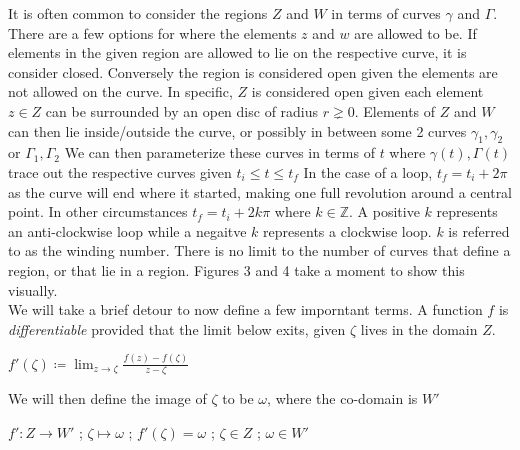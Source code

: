\documentclass[a4paper,man,natbib]{apa6}
\newcommand{\Z}{\mathbb{Z}}  %
\begin{document}
It is often common to consider the regions $ Z $ and $ W $ in terms of curves $ \gamma $ and $ \Gamma $.
There are a few options for where the elements $ z $ and $ w $ are allowed to be. If elements in the given region are allowed to lie on the respective curve, it is consider closed.
Conversely the region is considered open given the elements are not allowed on the curve. 
In specific, $ Z $ is considered open given each element $ z \in Z $ can be surrounded by an open disc of radius $ r \gneq  0 $.
Elements of $ Z $ and $ W $ can then lie inside/outside the curve, or possibly in between some 2 curves  $ \gamma_{1},\gamma_{2} $ or $ \Gamma_{1},\Gamma_{2} $
We can then parameterize these curves in terms of $ t $ where $ \gamma(t), \Gamma(t) $ trace out the respective curves given $ t_{i} \leq t \leq t_{f} $
In the case of a loop, $ t_{f} = t_{i} + 2\pi $ as the curve will end where it started, making one full revolution around a central point. 
In other circumstances $ t_{f} = t_{i} + 2k\pi $ where $ k \in \Z $. A positive $ k $ represents an anti-clockwise loop while a negaitve $ k $ represents a clockwise loop. 
$ k $ is referred to as the winding number. There is no limit to the number of curves that define a region, or that lie in a region. 
Figures 3 and 4 take a moment to show this visually. 
\\
We will take a brief detour to now define a few imporntant terms. 
A function $ f $ is \textit{differentiable} provided that the limit below exits, given $ \zeta $ lives in the domain $ Z $.

\begin{center}

      $ f'(\zeta) \coloneqq \lim_{z \to \zeta} \frac{f(z) - f(\zeta)}{z - \zeta} $ 

\end{center}

We will then define the image of $ \zeta $ to be $ \omega $, where the co-domain is $ W' $

\begin{center}

      $ f': Z \to W' $ ; $ \zeta \mapsto \omega $ ; $ f'(\zeta) = \omega $ ; $ \zeta \in Z $ ; $ \omega \in W' $

\end{center}
\end{document}
